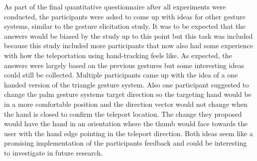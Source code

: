 As part of the final quantitative questionnaire after all experiments were conducted, the participants were asked to come up with ideas for other gesture systems, similar to the gesture elicitation study. It was to be expected that the answers would be biased by the study up to this point but this task was included because this study included more participants that now also had some experience with how the teleportation using hand-tracking feels like. As expected, the answers were largely based on the previous gestures but some interesting ideas could still be collected. Multiple participants came up with the idea of a one handed version of the triangle gesture system. Also one participant suggested to change the palm gesture systems target direction so the targeting hand would be in a more comfortable position and the direction vector would not change when the hand is closed to confirm the teleport location. The change they proposed would have the hand in an orientation where the thumb would face towards the user with the hand edge pointing in the teleport direction. Both ideas seem like a promising implementation of the participants feedback and could be interesting to investigate in future research.
